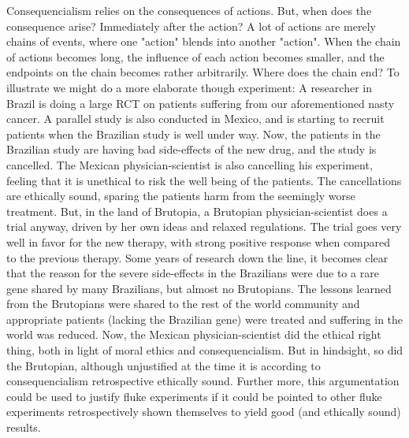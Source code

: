 \documentclass[12p]{article}
\begin{document}
Consequencialism relies on the consequences of actions.
But, when does the consequence arise?
Immediately after the action?
A lot of actions are merely chains of events, where one "action" blends into another "action".
When the chain of actions becomes long, the influence of each action becomes smaller, and the endpoints on the chain becomes rather arbitrarily.
Where does the chain end?
To illustrate we might do a more elaborate though experiment:
A researcher in Brazil is doing a large RCT on patients suffering from our aforementioned nasty cancer.
A parallel study is also conducted in Mexico, and is starting to recruit patients when the Brazilian study is well under way.
Now, the patients in the Brazilian study are having bad side-effects of the new drug, and the study is cancelled.
The Mexican physician-scientist is also cancelling his experiment, feeling that it is unethical to risk the well being of the patients.
The cancellations are ethically sound, sparing the patients harm from the seemingly worse treatment.
But, in the land of  Brutopia, a Brutopian physician-scientist does a trial anyway, driven by her own ideas and relaxed regulations.
The trial goes very well in favor for the new therapy, with strong positive response when compared to the previous therapy.
Some years of research down the line, it becomes clear that the reason for the severe side-effects in the Brazilians were due to a rare gene shared by many Brazilians, but almost no Brutopians.
The lessons learned from the Brutopians were shared to the rest of the world community and appropriate patients (lacking the Brazilian gene) were treated and suffering in the world was reduced.
Now, the Mexican physician-scientist did the ethical right thing, both in light of moral ethics and consequencialism.
But in hindsight, so did the Brutopian, although unjustified at the time it is according to consequencialism retrospective ethically sound.
Further more, this argumentation could be used to justify fluke experiments if it could be pointed to other fluke experiments retrospectively shown themselves to yield good (and ethically sound) results.
\end{document}

